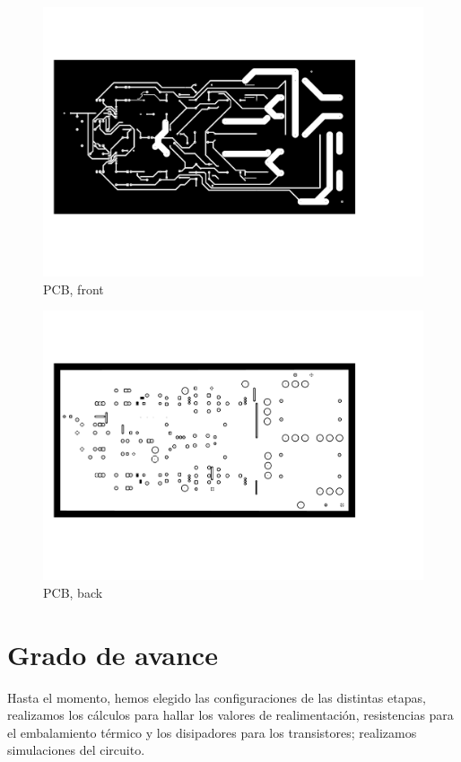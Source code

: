 \documentclass[a4paper,12pt,twoside]{article}
\begin{document}
\begin{figure}[H]
    \centering
    \includegraphics[height=0.7\textwidth]{img/PCB/amplificador-F.pdf}
    \caption{PCB, front}
    \label{fig:ac}
\end{figure}

\begin{figure}[H]
    \centering
    \includegraphics[height=0.7\textwidth]{img/PCB/amplificador-B.pdf}
    \caption{PCB, back}
    \label{fig:ac}
\end{figure}

\section{Grado de avance}

Hasta el momento, hemos elegido las configuraciones de las distintas etapas, realizamos los cálculos para hallar los valores de realimentación, resistencias para el embalamiento térmico y los disipadores para los transistores; realizamos simulaciones del circuito.
\end{document}
